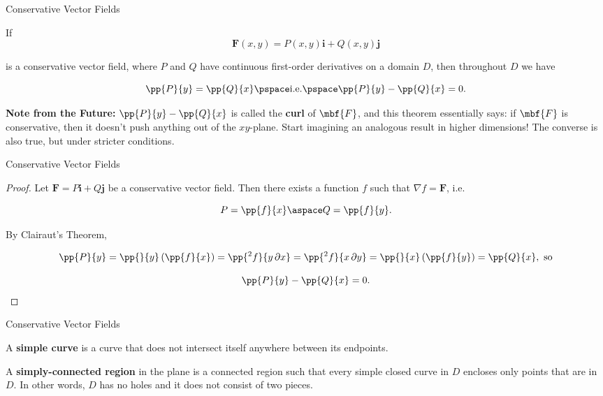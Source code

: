 \documentclass[11pt,english,
handout
]{beamer}
\begin{document}
\begin{frame}{Conservative Vector Fields}
\small

\begin{theorem}
If
\[
\mathbf{F}(x,y)=P(x,y)\mathbf{i}+Q(x,y)\mathbf{j}
\]

\vspace{3mm}
is a conservative vector field, where $P$ and $Q$ have continuous first-order derivatives on a domain $D$, then throughout $D$ we have

\[
\pp{P}{y}=\pp{Q}{x}\pspace\text{i.e.}\pspace\pp{P}{y}-\pp{Q}{x}=0.
\]
\end{theorem}\pause 

\textbf{Note from the Future:} $\displaystyle \pp{P}{y}-\pp{Q}{x}$ is called the \textbf{curl} of $\mbf{F}$, and this theorem essentially says: if $\mbf{F}$ is conservative, then it doesn't push anything out of the $xy$-plane. \pause Start imagining an analogous result in higher dimensions! \pause The converse is also true, but under stricter conditions.
\end{frame}









\begin{frame}{Conservative Vector Fields}
\small

\begin{proof}
Let $\mathbf{F}=P\mathbf{i}+Q\mathbf{j}$ be a conservative vector field. Then there exists a function $f$ such that $\nabla f =\mathbf{F}$, i.e.

\[
P=\pp{f}{x}\aspace Q=\pp{f}{y}.
\]\pause 

By Clairaut's Theorem,

\[
\pp{P}{y}=\pp{}{y}\left(\pp{f}{x}\right)=\pp{^2f}{y\,\partial x}=\pp{^2f}{x\,\partial y}=\pp{}{x}\left(\pp{f}{y}\right)=\pp{Q}{x},\text{ so}
\]

\[
\pp{P}{y}-\pp{Q}{x}=0.
\]
\end{proof}


\end{frame}







\begin{frame}{Conservative Vector Fields}
\small

\begin{definition}
A \textbf{simple curve} is a curve that does not intersect itself anywhere between its endpoints.
\end{definition}\pause

\lspace
\begin{definition}
A \textbf{simply-connected region} in the plane is a connected region such that every simple closed curve in $D$ encloses only points that are in $D$. In other words, $D$ has no holes and it does not consist of two pieces.
\end{definition}

\end{frame}
\end{document}
